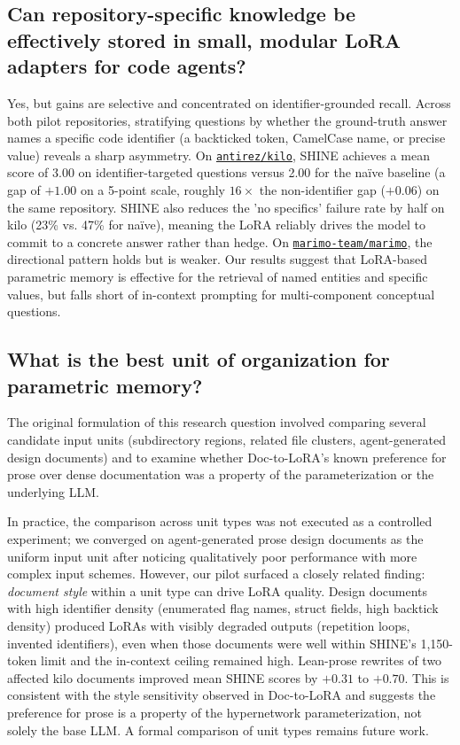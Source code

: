 \documentclass[conference,10.5pt]{IEEEtran}
\begin{document}
\subsection{Can repository-specific knowledge be effectively stored
in small, modular LoRA adapters for code agents?}

Yes, but gains are selective and concentrated on identifier-grounded recall. Across both pilot repositories, stratifying questions by whether the ground-truth answer names a specific code identifier (a backticked token, CamelCase name, or precise value) reveals a sharp asymmetry. On \href{https://github.com/antirez/kilo}{\texttt{antirez/kilo}}, SHINE achieves a mean score
of 3.00 on identifier-targeted questions versus 2.00 for the naïve
baseline (a gap of $+1.00$ on a 5-point scale, roughly $16\times$ the
non-identifier gap ($+0.06$) on the same repository. SHINE also reduces the
'no specifics' failure rate by half on kilo (23\% vs. 47\% for naïve),
meaning the LoRA reliably drives the model to commit to a concrete answer
rather than hedge. On \href{https://github.com/marimo-team/marimo}{\texttt{marimo-team/marimo}}, the directional pattern holds but is weaker. Our results suggest that LoRA-based parametric memory is effective for the retrieval of named entities and specific values, but falls short of in-context prompting for multi-component conceptual questions.
 
\subsection{What is the best unit of organization for parametric
memory?}
 
The original formulation of this research question involved comparing several
candidate input units (subdirectory regions, related file clusters, 
agent-generated design documents) and to examine whether Doc-to-LoRA's
known preference for prose over dense documentation was a property of the
parameterization or the underlying LLM.
 
In practice, the comparison across unit types
was not executed as a controlled experiment; we converged on agent-generated 
prose design documents as the uniform input unit after noticing qualitatively poor 
performance with more complex input schemes. However, our pilot surfaced a
closely related finding: \emph{document style} within a unit type can drive 
LoRA quality. Design documents with high identifier
density (enumerated flag names, struct fields, high backtick density) produced 
LoRAs with visibly degraded outputs (repetition loops, invented identifiers), 
even when those documents were well within SHINE's 1,150-token limit and the 
in-context ceiling remained high. Lean-prose rewrites of two affected kilo 
documents improved mean SHINE scores by $+0.31$ to $+0.70$. 
This is consistent with the style sensitivity
observed in Doc-to-LoRA and suggests the preference for prose is a property
of the hypernetwork parameterization, not solely the base LLM.
A formal comparison of unit types remains future work.
 
\end{document}
